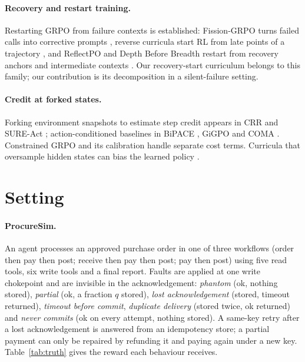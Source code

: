 \documentclass[11pt]{article}
\begin{document}
\paragraph{Recovery and restart training.} Restarting GRPO from failure contexts is established: Fission-GRPO turns failed calls into corrective prompts \citep{zhang2026fission}, reverse curricula start RL from late points of a trajectory \citep{xi2024r3}, and ReflectPO and Depth Before Breadth restart from recovery anchors and intermediate contexts \citep{li2026reflectpo,du2026depth}. Our recovery-start curriculum belongs to this family; our contribution is its decomposition in a silent-failure setting.

\paragraph{Credit at forked states.} Forking environment snapshots to estimate step credit appears in CRR \citep{li2026crr} and SURE-Act \citep{liu2026sureact}; action-conditioned baselines in BiPACE \citep{wang2026bipace}, GiGPO \citep{feng2025gigpo} and COMA \citep{foerster2017coma}. Constrained GRPO and its calibration \citep{girgis2026cgrpo,han2026budget} handle separate cost terms. Curricula that oversample hidden states can bias the learned policy \citep{jiang2022samplr}.

\section{Setting}\label{sec:setup}

\paragraph{ProcureSim.} An agent processes an approved purchase order in one of three workflows (order then pay then post; receive then pay then post; pay then post) using five read tools, six write tools and a final report. Faults are applied at one write chokepoint and are invisible in the acknowledgement: \emph{phantom} (ok, nothing stored), \emph{partial} (ok, a fraction $q$ stored), \emph{lost acknowledgement} (stored, timeout returned), \emph{timeout before commit}, \emph{duplicate delivery} (stored twice, ok returned) and \emph{never commits} (ok on every attempt, nothing stored). A same-key retry after a lost acknowledgement is answered from an idempotency store; a partial payment can only be repaired by refunding it and paying again under a new key. Table~\ref{tab:truth} gives the reward each behaviour receives.
\end{document}
